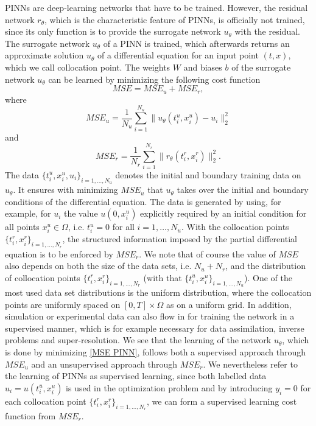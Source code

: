 PINNs are deep-learning networks that have to be trained. However, the residual network $r_\theta$, which is the characteristic feature of PINNs, is officially not trained, since its only function is to provide the surrogate network $u_\theta$ with the residual. The surrogate network $u_\theta$ of a PINN is trained, which afterwards returns an approximate solution $u_\theta$ of a differential equation for an input point $(t,x)$, which we call collocation point. The weights $W$ and biases $b$ of the surrogate network $u_\theta$ can be learned by minimizing the following cost function
\begin{equation}
    \label{MSE PINN}
    MSE = MSE_u + MSE_r, 
\end{equation}
where
\begin{equation*}
    MSE_u = \frac{1}{N_u} \sum^{N_u}_{i = 1} \lVert u_\theta(t^{u}_i, x^{u}_i) - u_i \rVert^{2}_{2}
\end{equation*}
and
\begin{equation*}
    MSE_r = \frac{1}{N_r} \sum^{N_r}_{i = 1} \lVert r_\theta (t^{r}_i, x^{r}_i) \rVert^{2}_{2}.
\end{equation*}
The data $\{t^{u}_i, x^{u}_i, u_i \}_{i = 1, \ldots, N_u}$ denotes the initial and boundary training data on $u_\theta$. It ensures with minimizing $MSE_u$ that $u_\theta$ takes over the initial and boundary conditions of the differential equation. The data is generated by using, for example, for $u_i$ the value $u(0,x^{u}_i)$ explicitly required by an initial condition for all points $x^{u}_i \in \Omega$, i.e. $t^{u}_i = 0$ for all $i = 1, \ldots, N_u$. With the collocation points $\{t^{r}_i, x^{r}_i \}_{i = 1, \ldots, N_r}$, the structured information imposed by the partial differential equation is to be enforced by $MSE_r$. We note that of course the value of $MSE$ also depends on both the size of the data sets, i.e. $N_u + N_r$, and the distribution of collocation points $\{t^{r}_i, x^{r}_i \}_{i = 1, \ldots, N_r}$ (with that $\{t^{u}_i, x^{u}_i \}_{i = 1, \ldots, N_u}$). One of the most used data set distributions is the uniform distribution, where the collocation points are uniformly spaced on $\left[ 0, T \right] \times \Omega$ as on a uniform grid. In addition, simulation or experimental data can also flow in for training the network in a supervised manner, which is for example necessary for data assimilation, inverse problems and super-resolution. We see that the learning of the network $u_\theta$, which is done by minimizing \cref{MSE PINN}, follows both a supervised approach through $MSE_u$ and an unsupervised approach through $MSE_r$. We nevertheless refer to the learning of PINNs as supervised learning, since both labelled data $u_i = u(t^{u}_i, x^{u}_i)$ is used in the optimization problem and by introducing $y_i=0$ for each collocation point $\{t^{r}_i, x^{r}_i \}_{i = 1, \ldots, N_r}$, we can form a supervised learning cost function from $MSE_r$. \\
